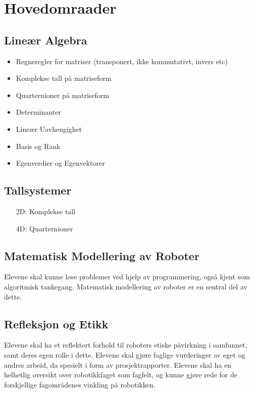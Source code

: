 \section*{Hovedomraader} \label{Sec: Hovedomraader}


\subsection*{Lineær Algebra}

    \begin{itemize}
        \item Regneregler for matriser (transponert, ikke kommutativt, invers etc)
        \item Komplekse tall på matriseform
        \item Quarternioner på matriseform
        \item Determinanter
        \item Lineær Uavhengighet
        \item Basis og Rank
        \item Egenverdier og Egenvektorer
    \end{itemize}


\subsection*{Tallsystemer}

    \begin{itemize}
        \item[2D:] Komplekse tall
        \item[4D:] Quarternioner
    \end{itemize}


\subsection*{Matematisk Modellering av Roboter}
    Elevene skal kunne løse problemer ved hjelp av programmering, også kjent som algoritmisk tankegang. Matematisk modellering av roboter er en sentral del av dette.


\subsection*{Refleksjon og Etikk}
    Elevene skal ha et reflektert forhold til roboters etiske påvirkning i samfunnet, samt deres egen rolle i dette.
    Elevene skal gjøre faglige vurderinger av eget og andres arbeid, da spesielt i form av prosjektrapporter.
    Elevene skal ha en helhetlig oversikt over robotikkfaget som fagfelt, og kunne gjøre rede for de forskjellige fagområdenes vinkling på robotikken.


